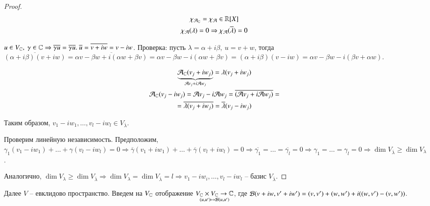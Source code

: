 \documentclass[main]{subfiles}
\begin{document}
\begin{proof}
    \begin{gather*}
        \chi_{\mathcal{A}_{\mathbb{C}}} = \chi_{\mathcal{A}} \in \mathbb{R}[X] \\
        \chi_{\mathcal{A}}(\lambda) = 0 \Rightarrow \chi_{\mathcal{A}}(\overline{\lambda}) = 0 \\
    \end{gather*}
    
    \begin{remark}
        $u \in V_{\mathbb{C}}, \ \gamma \in \mathbb{C} \Rightarrow \overline{\gamma u} = \overline{\gamma} \overline{u}. \ \overline{u} = \overline{v + iw} = v - iw$.
        Проверка: пусть $\lambda = \alpha + i\beta, \ u = v + w$, тогда $\overline{(\alpha + i\beta)(v + iw)} =
         \overline{\alpha v - \beta w + i(\alpha w + \beta v)} = \alpha v - \beta w - i(\alpha w + \beta v) = (\alpha + i\beta)(v - iw) =
        \alpha v - \beta w -i(\beta v + \alpha w)$.
    \end{remark}

    \begin{gather*}
        \underbrace{\mathcal{A}_{\mathbb{C}}(v_j + iw_j)}_{\mathcal{A} v_j + i\mathcal{A} w_j} = \lambda(v_j + iw_j) \\
        \mathcal{A}_{\mathbb{C}}(v_j - iw_j) = \mathcal{A} v_j - i\mathcal{A} w_j = \overline{(\mathcal{A} v_j + i\mathcal{A} w_j)} = \\
        = \overline{\lambda(v_j + iw_j)} = \overline{\lambda}(v_j-iw_j)
    \end{gather*}

    Таким образом, $v_1 - iw_1, \ldots, v_l - iw_l \in V_{\overline{\lambda}}$.

    Проверим линейную независимость. Предположим, $\gamma_1(v_1 - iw_1) + \ldots +
    \gamma(v_l - iw_l) = 0 \Rightarrow \overline{\gamma}(v_1 + iw_1) + \ldots + \overline{\gamma}(v_l + iw_l) = 0 \Rightarrow
    \overline{\gamma_1} = \ldots = \overline{\gamma_l} = 0 \Rightarrow \gamma_1 = \ldots = \gamma_l = 0 \Rightarrow
    \dim V_{\overline{\lambda}} \geq \dim V_{\lambda}$.

    Аналогично, $\dim V_{\lambda} \geq \dim V_{\overline{\lambda}} \Rightarrow
    \dim V_{\lambda} = \dim V_{\overline{\lambda}} = l \Rightarrow 
    v_1 - iw_i, \ldots, v_l - iw_l$ -- базис $V_{\overline{\lambda}}$.
\end{proof}

    Далее $V$ -- евклидово пространство. Введем на $V_{\mathbb{C}}$ отображение $\underset{(u, u') \mapsto \mathcal{B}(u, u')}{V_{\mathbb{C}}\times V_{\mathbb{C}}\to\mathbb{C}}$, 
    где $\mathcal{B}(v+iw, v'+iw') = (v, v') + (w, w') + i((w, v') - (v, w'))$.
\end{document}
